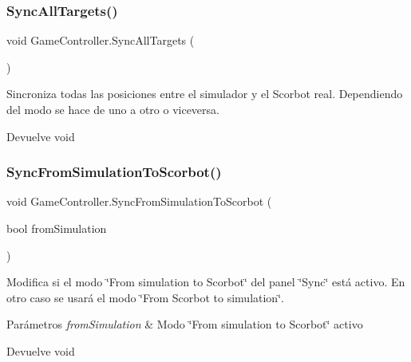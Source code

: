 \subsubsection{\texorpdfstring{SyncAllTargets()}{SyncAllTargets()}}
{\footnotesize\ttfamily void Game\+Controller.\+Sync\+All\+Targets (\begin{DoxyParamCaption}{ }\end{DoxyParamCaption})\hspace{0.3cm}{\ttfamily [inline]}}

Sincroniza todas las posiciones entre el simulador y el Scorbot real. Dependiendo del modo se hace de uno a otro o viceversa. \begin{DoxyReturn}{Devuelve}
void 
\end{DoxyReturn}
\mbox{\label{class_game_controller_a3e908f52a48528254dddc0f4f4a9d9f8}} 
\subsubsection{\texorpdfstring{SyncFromSimulationToScorbot()}{SyncFromSimulationToScorbot()}}
{\footnotesize\ttfamily void Game\+Controller.\+Sync\+From\+Simulation\+To\+Scorbot (\begin{DoxyParamCaption}\item[{bool}]{from\+Simulation }\end{DoxyParamCaption})\hspace{0.3cm}{\ttfamily [inline]}}

Modifica si el modo \char`\"{}\+From simulation to Scorbot\char`\"{} del panel \char`\"{}\+Sync\char`\"{} está activo. En otro caso se usará el modo \char`\"{}\+From Scorbot to simulation\char`\"{}. 
\begin{DoxyParams}{Parámetros}
{\em from\+Simulation} & Modo \char`\"{}\+From simulation to Scorbot\char`\"{} activo \\
\hline
\end{DoxyParams}
\begin{DoxyReturn}{Devuelve}
void 
\end{DoxyReturn}
\mbox{\label{class_game_controller_afb0be280e9e68853555db2ef42337bd9}} 
